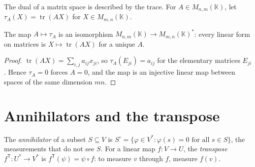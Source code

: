 The dual of a matrix space is described by the trace. For $A\in M_{n,m}(\mathbb K)$, let $\tau_A(X)=\operatorname{tr}(AX)$
for $X\in M_{m,n}(\mathbb K)$.

\begin{proposition}\label{linear:prop:trace}
The map $A\mapsto\tau_A$ is an isomorphism $M_{n,m}(\mathbb K)\to M_{m,n}(\mathbb K)^*$: every linear form on matrices is
$X\mapsto\operatorname{tr}(AX)$ for a unique $A$.
\end{proposition}
\begin{proof}
$\operatorname{tr}(AX)=\sum_{i,j}a_{ij}x_{ji}$, so $\tau_A(E_{ji})=a_{ij}$ for the elementary matrices $E_{ji}$. Hence
$\tau_A=0$ forces $A=0$, and the map is an injective linear map between spaces of the same dimension $mn$.
\end{proof}

\section{Annihilators and the transpose}\label{linear:sec:transpose}

\begin{definition}
The \emph{annihilator} of a subset $S\subseteq V$ is $S^\circ=\{\varphi\in V^*:\varphi(s)=0\text{ for all }s\in S\}$, the
measurements that do not see $S$. For a linear map $f:V\to U$, the \emph{transpose} $f^{\mathsf T}:U^*\to V^*$ is
$f^{\mathsf T}(\psi)=\psi\circ f$: to measure $v$ through $f$, measure $f(v)$.
\end{definition}

